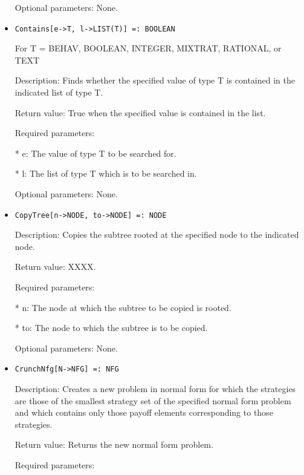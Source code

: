 \begin{itemize}
\item
[Optional parameters:] None.
\ed

\item
\begin{verbatim}
Contains[e->T, l->LIST(T)] =: BOOLEAN
\end{verbatim}

For T = BEHAV, BOOLEAN, INTEGER, MIXTRAT, RATIONAL, or TEXT

\bd
\item
[Description:] Finds whether the specified value of type T is
contained in the indicated list of type T.
\item 
[Return value:] True when the specified value is contained in the list.
\item
[Required parameters:]\hfil\null
	
\bd
\item	
[* e:] The value of type T to be searched for.
\item
[* l:] The list of type T which is to be searched in.
\ed

\item
[Optional parameters:] None.
\ed

\item

\begin{verbatim}
CopyTree[n->NODE, to->NODE] =: NODE
\end{verbatim}

\bd
\item
[Description:] Copies the subtree rooted at the specified node to the
indicated node.
\item
[Return value:] XXXX.
\item
[Required parameters:]\hfil\null

\bd
\item	
[* n:] The node at which the subtree to be copied is rooted.
\item
[* to:] The node to which the subtree is to be copied.
\ed

\item
[Optional parameters:] None.
\ed

\item
\begin{verbatim}
CrunchNfg[N->NFG] =: NFG
\end{verbatim}

\bd
\item
[Description:] Creates a new problem in normal form for which the 
strategies are those of the smallest strategy set of the specified
normal form problem and which contains only those payoff elements 
corresponding to those strategies.
\item
[Return value:] Returns the new normal form problem.
\item
[Required parameters:]\hfil\null
	

\end{itemize}
